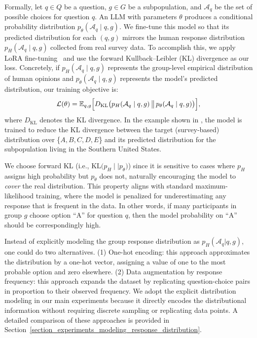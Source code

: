 Formally, let \(q \in Q\) be a question, \(g \in G\) be a subpopulation, and \(\mathcal{A}_q\) be the set of possible choices for question \(q\). 
An LLM with parameters \(\theta\) produces a conditional probability distribution \(p_{\theta}(\mathcal{A}_q \mid q, g)\). 
We fine-tune this model so that its predicted distribution for each \((q, g)\) mirrors the human response distribution \(p_H(\mathcal{A}_q \mid q, g)\) collected from real survey data.
To accomplish this, we apply LoRA fine-tuning~\cite{hu2021lora} and use the forward Kullback--Leibler (KL) divergence as our loss. 
Concretely, if \(p_H(\mathcal{A}_q \mid q, g)\)
represents the group-level empirical distribution of human opinions and \(p_{\theta}(\mathcal{A}_q \mid q, g)\) represents the model’s predicted distribution, our training objective is:
\[
\textstyle
\mathcal{L}(\theta) 
= \mathbb{E}_{q,g} \Bigl[
  D_{\mathrm{KL}}\bigl(
    p_H(\mathcal{A}_q \mid q, g) \,\big\|\, p_{\theta}(\mathcal{A}_q \mid q, g)
  \bigr)
\Bigr],
\]
where \(D_{\mathrm{KL}}\) denotes the KL divergence. In the example shown in , the model is trained to reduce the KL divergence between the target (survey-based) distribution over \{\(A, B, C, D, E\)\} and its predicted distribution for the subpopulation living in the Southern United States.

We choose forward KL (i.e., \(\mathrm{KL}\bigl(p_H\mid\mid p_\theta\bigr)\)) since it is sensitive to cases where \(p_H\) assigns high probability but \(p_\theta\) does not, naturally encouraging the model to \emph{cover} the real distribution.
This property aligns with standard maximum-likelihood training, where the model is penalized for underestimating any response that is frequent in the data.
In other words, if many participants in group \(g\) choose option ``A'' for question \(q\), then the model probability on ``A'' should be correspondingly high.

Instead of explicitly modeling the group response distribution as \(p_H(\mathcal{A}_q | q, g)\),
one could do two alternatives.
(1) One-hot encoding:
this approach \cite{li2024culturellm} approximates the distribution by a one-hot vector,
assigning a value of one to the most probable option and zero elsewhere.
(2) Data augmentation by response frequency:
this approach \cite{zhao2023group} expands the dataset by replicating
question-choice pairs in proportion to their observed frequency.
We adopt the explicit distribution modeling in our main experiments because it directly encodes the distributional information without requiring discrete sampling or replicating data points.
A detailed comparison of these approaches is provided in Section~\ref{section_experiments_modeling_response_distribution}.

